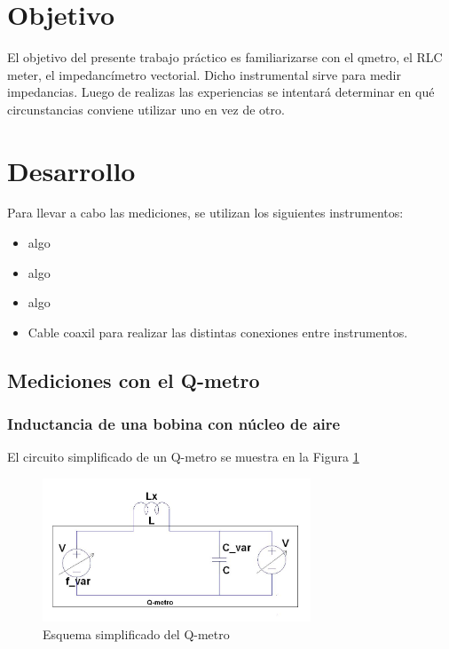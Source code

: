\documentclass[a4paper,10pt]{article}
\title{  }
\begin{document}
	\maketitle %
	\newpage

	\tableofcontents %
	\newpage


	\section{Objetivo}
	
	\indent	El objetivo del presente trabajo práctico es familiarizarse con 
	el qmetro, el RLC meter, el impedancímetro vectorial. Dicho instrumental
	sirve para medir impedancias. Luego de realizas las experiencias se 
	intentará determinar en qué circunstancias conviene utilizar uno en vez 
	de otro.

	\newpage
	\section{Desarrollo}
	
	\indent Para llevar a cabo las mediciones, se utilizan los siguientes 
	instrumentos:
		\begin{itemize}
			\item algo
			\item algo
			\item algo
			\item Cable coaxil para realizar las distintas conexiones entre 
			instrumentos.
		\end{itemize}	
	
		\subsection{Mediciones con el Q-metro}
		\subsubsection{Inductancia de una bobina con n\'ucleo de aire}
		
		\indent El circuito simplificado de un Q-metro se muestra en la Figura
		\ref{img001}

			\begin{figure}[!htb]
				\centering
				\includegraphics[width=8cm]
				{Imagenes/qmetro.png}
				\caption{Esquema simplificado del Q-metro}
				\label{img001} 
			\end{figure}
\end{document}
